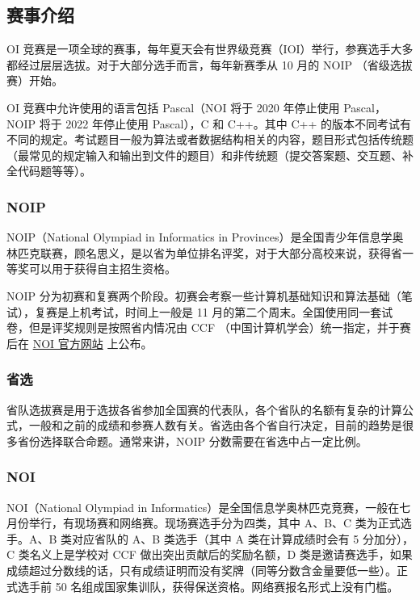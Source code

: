 
\subsection{赛事介绍}

OI 竞赛是一项全球的赛事，每年夏天会有世界级竞赛（IOI）举行，参赛选手大多都经过层层选拔。对于大部分选手而言，每年新赛季从 10 月的 NOIP （省级选拔赛）开始。

OI 竞赛中允许使用的语言包括 Pascal（NOI 将于 2020 年停止使用 Pascal，NOIP 将于 2022 年停止使用 Pascal），C 和 C++。其中 C++ 的版本不同考试有不同的规定。考试题目一般为算法或者数据结构相关的内容，题目形式包括传统题（最常见的规定输入和输出到文件的题目）和非传统题（提交答案题、交互题、补全代码题等等）。

\subsubsection{NOIP}

NOIP（National Olympiad in Informatics in Provinces）是全国青少年信息学奥林匹克联赛，顾名思义，是以省为单位排名评奖，对于大部分高校来说，获得省一等奖可以用于获得自主招生资格。

NOIP 分为初赛和复赛两个阶段。初赛会考察一些计算机基础知识和算法基础（笔试），复赛是上机考试，时间上一般是 11 月的第二个周末。全国使用同一套试卷，但是评奖规则是按照省内情况由 CCF （中国计算机学会）统一指定，并于赛后在 \href{http://www.noi.cn}{NOI 官方网站} 上公布。

\subsubsection{省选}

省队选拔赛是用于选拔各省参加全国赛的代表队，各个省队的名额有复杂的计算公式，一般和之前的成绩和参赛人数有关。省选由各个省自行决定，目前的趋势是很多省份选择联合命题。通常来讲，NOIP 分数需要在省选中占一定比例。

\subsubsection{NOI}

NOI（National Olympiad in Informatics）是全国信息学奥林匹克竞赛，一般在七月份举行，有现场赛和网络赛。现场赛选手分为四类，其中 A、B、C 类为正式选手。A、B 类对应省队的 A、B 类选手（其中 A 类在计算成绩时会有 5 分加分），C 类名义上是学校对 CCF 做出突出贡献后的奖励名额，D 类是邀请赛选手，如果成绩超过分数线的话，只有成绩证明而没有奖牌（同等分数含金量要低一些）。正式选手前 50 名组成国家集训队，获得保送资格。网络赛报名形式上没有门槛。

